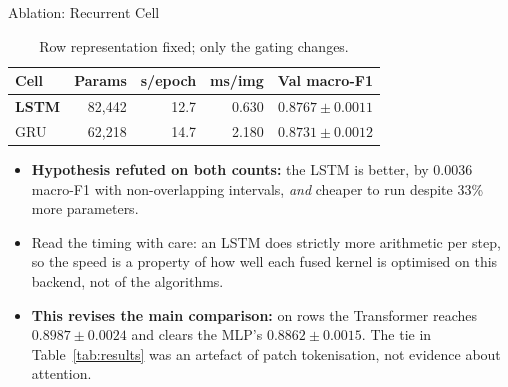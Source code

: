 \begin{frame}{Ablation: Recurrent Cell}
\begin{table}
\centering
\caption{Row representation fixed; only the gating changes.}
\label{tab:ablation-cell}
\small
\begin{tabular}{lrrrr}
\toprule
\textbf{Cell} & \textbf{Params} & \textbf{s/epoch} & \textbf{ms/img} & \textbf{Val macro-F1} \\
\midrule
\textbf{LSTM} & 82{,}442 & 12.7 & 0.630 & $\mathbf{0.8767 \pm 0.0011}$ \\
GRU           & 62{,}218 & 14.7 & 2.180 & $0.8731 \pm 0.0012$ \\
\bottomrule
\end{tabular}
\end{table}

\small
\begin{itemize}
    \item \textbf{Hypothesis refuted on both counts:} the LSTM is better, by 0.0036 macro-F1 with
          non-overlapping intervals, \emph{and} cheaper to run despite 33\% more parameters.
    \item Read the timing with care: an LSTM does strictly more arithmetic per step, so the speed is a
          property of how well each fused kernel is optimised on this backend, not of the algorithms.
    \item \textbf{This revises the main comparison:} on rows the Transformer reaches
          $0.8987 \pm 0.0024$ and clears the MLP's $0.8862 \pm 0.0015$. The tie in
          Table~\ref{tab:results} was an artefact of patch tokenisation, not evidence about attention.
\end{itemize}
\end{frame}

